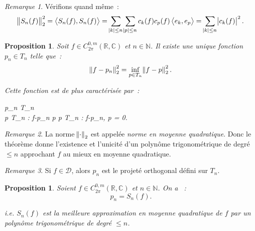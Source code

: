 \documentclass{report}
\newtheorem{prp}[thm]{Proposition}
\theoremstyle{definition}
\theoremstyle{remark}
\newtheorem*{rmq}{Remarque}
\numberwithin{equation}{section}
\newcommand{\C}{\mathbb C}
\newcommand{\R}{\mathbb R}
\newcommand{\N}{\mathbb N}
\newcommand{\scpr}[2]{\left\langle #1, #2\right\rangle}
\newcommand{\CmT}[2]{C^{#1,m}_{#2}}
\newcommand{\CzmT}[1]{\CmT 0{#1}}
\newcommand{\Czm}{\CzmT{2\pi}}
\begin{document}
			\begin{rmq} Vérifions quand même~:
			\begin{equation}
				\norm {S_n(f)}_2^2 = \scpr {S_n(f)}{S_n(f)} = \sum_{\abs k \leq n}\sum_{\abs p \leq n}c_k(f)c_p(f)\scpr {e_k}{e_p}
					= \sum_{\abs k \leq n}\abs {c_k(f)}^2.
			\end{equation}
			\end{rmq}

			\begin{prp} Soit $f \in \Czm(\R, \C)$ et $n \in \N$. Il existe une unique fonction $p_n \in T_n$ telle que~:
			\begin{equation}
				\norm {f-p_n}_2^2 = \inf_{p \in T_n}\norm {f-p}_2^2.
			\end{equation}

			Cette fonction est de plus caractérisée par~:
			\begin{subnumcases}
				p_n \in T_n \\
				\forall p \in T_n : f-p_n \perp p  \forall p \in T_n : \scpr {f-p_n}p = 0.
			\end{subnumcases}
			\end{prp}

			\begin{rmq} La norme $\norm \cdot_2$ est appelée \textit{norme en moyenne quadratique}. Donc le théorème donne l'existence et l'unicité d'un
			polynôme trigonométrique de degré $\leq n$ approchant $f$ au mieux en moyenne quadratique.
			\end{rmq}

			\begin{rmq} Si $f \in \mathcal D$, alors $p_n$ est le projeté orthogonal défini sur $T_n$.
			\end{rmq}

			\begin{prp} Soient $f \in \Czm(\R, \C)$ et $n \in \N$. On a ~:
			\begin{equation}
				p_n = S_n(f).
			\end{equation}

			i.e. $S_n(f)$ est la meilleure approximation en moyenne quadratique de $f$ par un polynôme trigonométrique de degré $\leq n$.
			\end{prp}
\end{document}
